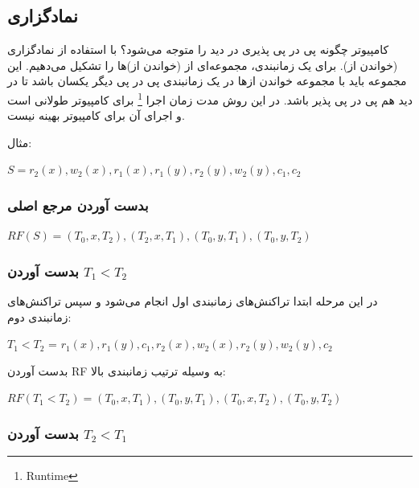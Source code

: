 \documentclass[a4paper]{article}
\begin{document}
\newpage

\subsection{نمادگزاری}

کامپیوتر چگونه پی در پی پذیری در دید را متوجه می‌شود؟ با استفاده از نمادگزاری
(خواندن از). برای یک زمانبندی، مجموعه‌ای از (خواندن از‌)ها را تشکیل می‌دهیم. این
مجموعه باید با مجموعه خواندن از‌ها در یک زمانبندی پی در پی دیگر یکسان باشد تا در
دید هم پی در پی پذیر باشد. در این روش مدت زمان اجرا \footnote{Runtime} برای
کامپیوتر طولانی است و اجرای آن برای کامپیوتر بهینه نیست.

مثال:

\begin{LTR}
$S = r_{2}(x), w_{2}(x), r_{1}(x), r_{1}(y), r_{2}(y), w_{2}(y), c_{1}, c_{2} $
\end{LTR}

\subsubsection*{بدست آوردن مرجع اصلی}

\begin{LTR}
$RF(S) = (T_{0}, x, T_{2}), (T_{2}, x, T_{1}), (T_{0}, y, T_{1}), (T_{0}, y, T_{2})$
\end{LTR}

\subsubsection*{بدست آوردن $T_{1} < T_{2}$}

در این مرحله ابتدا تراکنش‌های زمانبندی اول انجام می‌شود و سپس تراکنش‌های زمانبندی دوم:

\begin{LTR}
$T_{1} < T_{2}$ = $r_{1}(x), r_{1}(y), c_{1}, r_{2}(x), w_{2}(x), r_{2}(y), w_{2}(y), c_{2}$
\end{LTR}

بدست آوردن RF به وسیله ترتیب زمانبندی بالا:

\begin{LTR}
$RF(T_{1} < T_{2}) = (T_{0}, x, T_{1}), (T_{0}, y, T_{1}), (T_{0}, x, T_{2}), (T_{0}, y, T_{2})$
\end{LTR}

\subsubsection*{بدست آوردن $T_{2} < T_{1}$}
\end{document}
